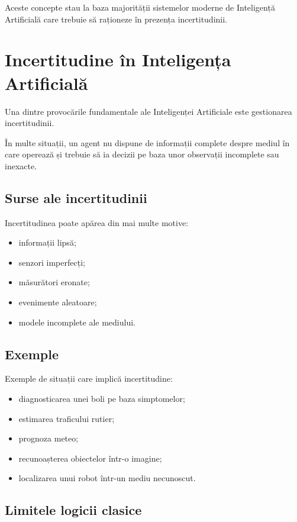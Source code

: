 \documentclass[12pt,a4paper]{article}
\begin{document}
Aceste concepte stau la baza majorității sistemelor moderne de Inteligență Artificială care trebuie să raționeze în prezența incertitudinii.






\section{Incertitudine în Inteligența Artificială}

Una dintre provocările fundamentale ale Inteligenței Artificiale este gestionarea incertitudinii.

În multe situații, un agent nu dispune de informații complete despre mediul în care operează și trebuie să ia decizii pe baza unor observații incomplete sau inexacte.

\subsection{Surse ale incertitudinii}

Incertitudinea poate apărea din mai multe motive:

\begin{itemize}
\item informații lipsă;
\item senzori imperfecți;
\item măsurători eronate;
\item evenimente aleatoare;
\item modele incomplete ale mediului.
\end{itemize}

\subsection{Exemple}

Exemple de situații care implică incertitudine:

\begin{itemize}
\item diagnosticarea unei boli pe baza simptomelor;
\item estimarea traficului rutier;
\item prognoza meteo;
\item recunoașterea obiectelor într-o imagine;
\item localizarea unui robot într-un mediu necunoscut.
\end{itemize}

\subsection{Limitele logicii clasice}
\end{document}
